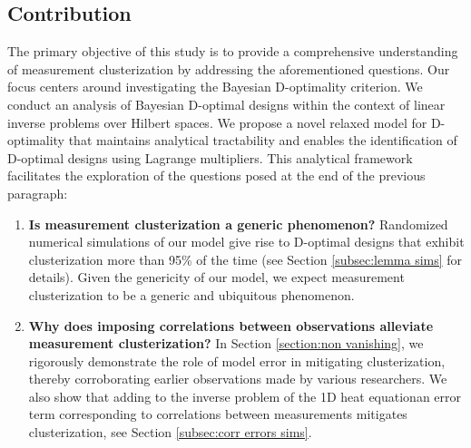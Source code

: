 \subsection{Contribution}
The primary objective of this study is to provide a comprehensive
understanding of measurement clusterization by addressing the
aforementioned questions. Our focus centers around investigating the
Bayesian D-optimality criterion. We conduct an analysis of Bayesian
D-optimal designs within the context of linear inverse problems over
Hilbert spaces. We propose a novel relaxed model for D-optimality that
maintains analytical tractability and enables the identification of
D-optimal designs using Lagrange multipliers. This analytical
framework facilitates the exploration of the questions posed at the
end of the previous paragraph:


\begin{enumerate}
\item \label{q:generic} \textbf{Is measurement clusterization a
  generic phenomenon?}
  Randomized numerical simulations of our model give rise to D-optimal
  designs that exhibit clusterization more than 95\% of the time (see
  Section \ref{subsec:lemma sims} for details). Given the genericity
  of our model, we expect measurement clusterization to be a generic
  and ubiquitous phenomenon.

\item \label{q:mitigate} \textbf{Why does imposing correlations
  between observations alleviate measurement clusterization?} In
  Section \ref{section:non vanishing}, we rigorously demonstrate the
  role of model error in mitigating clusterization, thereby
  corroborating earlier observations made by various researchers. We
  also show that adding to the inverse problem of the 1D heat
  equationan error term corresponding to correlations between
  measurements mitigates clusterization, see Section \ref{subsec:corr
    errors sims}.


\end{enumerate}
